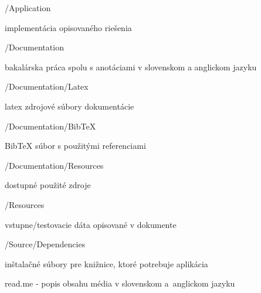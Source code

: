 \begin{my_itemize}
\emptyitem /Application
	\begin{my_itemize}
	\myitem implementácia opisovaného riešenia
	\end{my_itemize}
\emptyitem /Documentation
	\begin{my_itemize}
	\myitem bakalárska práca spolu s anotáciami v slovenskom a anglickom jazyku
	\end{my_itemize}
\emptyitem /Documentation/Latex
	\begin{my_itemize}
	\myitem latex zdrojové súbory dokumentácie
	\end{my_itemize}
\emptyitem /Documentation/BibTeX
	\begin{my_itemize}
	\myitem BibTeX súbor s použitými referenciami
	\end{my_itemize}
\emptyitem /Documentation/Resources
	\begin{my_itemize}
	\myitem dostupné použité zdroje
	\end{my_itemize}
\emptyitem /Resources
	\begin{my_itemize}
	\myitem vstupne/testovacie dáta opisované v dokumente
	\end{my_itemize}
\emptyitem /Source/Dependencies
	\begin{my_itemize}
	\myitem inštalačné súbory pre knižnice, ktoré potrebuje aplikácia
	\end{my_itemize}
\emptyitem read.me	- popis obsahu média v slovenskom a~anglickom jazyku
\end{my_itemize}
